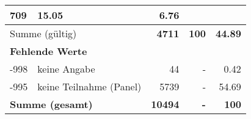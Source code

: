 \begin{longtable}{lXrrr}
       \num{709} &
       \num[round-mode=places,round-precision=2]{15,05} &
         \num[round-mode=places,round-precision=2]{6,76} \\
     \midrule
     \multicolumn{2}{l}{Summe (gültig)} &
       \textbf{\num{4711}} &
     \textbf{100} &
       \textbf{\num[round-mode=places,round-precision=2]{44,89}} \\
     \multicolumn{5}{l}{\textbf{Fehlende Werte}}\\
       -998 &
       keine Angabe &
         \num{44} &
        - &
         \num[round-mode=places,round-precision=2]{0,42} \\
       -995 &
       keine Teilnahme (Panel) &
         \num{5739} &
        - &
         \num[round-mode=places,round-precision=2]{54,69} \\
     \midrule
     \multicolumn{2}{l}{\textbf{Summe (gesamt)}} &
          \textbf{\num{10494}} &
        \textbf{-} &
        \textbf{100} \\
     \bottomrule
     \end{longtable}
     
